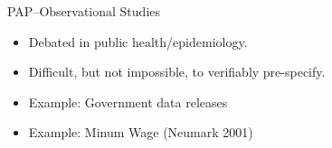 \documentclass{beamer}
\begin{document}
{ %
    \begin{frame}[plain]
     \end{frame}
}
\begin{frame}{PAP--Observational Studies}
\begin{itemize}
\item Debated in public health/epidemiology.
\item Difficult, but not impossible, to verifiably pre-specify.
\item Example: Government data releases
\item Example: Minum Wage (Neumark 2001)
\end{itemize}
\end{frame}
\end{document}
